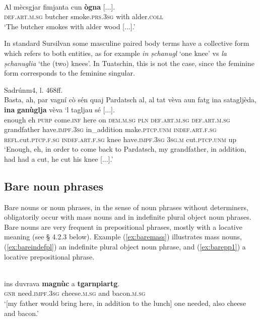 \ea\label{}
\\
\gll  Al mècsgjar fimjanta cun \textbf{ògna} [...].\\
\textsc{def.art.m.sg} butcher smoke.\textsc{prs.3sg} with alder.\textsc{coll} \\
\glt `The butcher smokes with alder wood [...].'
\z

In standard Sursilvan some masculine paired body terms have a collective form which refers to both entities, as for example \textit{in ṣchanugl} `one knee’ vs \textit{la ṣchanuglia} `the (two) knees’. In Tuatschin, this is not the case, since the feminine form corresponds to the feminine singular.

\ea
\label{}
 {Sadrún}{m4, l. 468ff.}\\
\gll   Basta, ah, par vagní cò sén quaj Pardatsch al, al tat vèva aun fatg ina satagljèda, \textbf{ina} \textbf{ganùglja} vèva `l tagljau sé [...]. \\
enough eh \textsc{purp} come.\textsc{inf} here on \textsc{dem.m.sg} \textsc{pln} \textsc{def.art.m.sg} \textsc{def.art.m.sg} grandfather have.\textsc{impf.3sg} in\_addition make.\textsc{ptcp.unm} \textsc{indef.art.f.sg} \textsc{refl.}cut.\textsc{ptcp.f.sg} \textsc{indef.art.f.sg} knee have.\textsc{impf.3sg} \textsc{3sg.m} cut.\textsc{ptcp.unm} up\\
\glt `Enough, eh, in order to come back to Pardatsch, my grandfather, in addition, had had a cut, he cut his knee [...].'
\z

\subsection{Bare noun phrases}
Bare nouns or noun phrases, in the sense of noun phrases without determiners, obligatorily occur with mass nouns and in indefinite plural object noun phrases. Bare nouns are very frequent in prepositional phrases, mostly with a locative meaning (see § 4.2.3 below). Example (\ref{ex:baremass}) illustrates mass nouns, (\ref{ex:bareindefpl}) an indefinite plural object noun phrase, and (\ref{ex:barepp1}) a locative prepositional phrase.

\ea
\label{ex:baremass}
\\
	\gll [...] ins duvrava \textbf{magnùc} a \textbf{tgarnpiartg}.   \\
{} \textsc{gnr} need.\textsc{impf.3sg} cheese.\textsc{m.sg} and bacon.\textsc{m.sg} \\
\glt `[my father would bring here, in addition to the lunch] one needed, also cheese and bacon.'
\z

